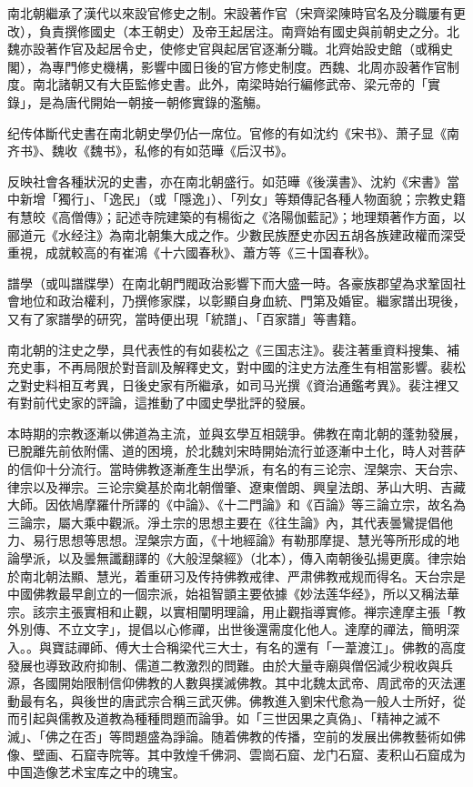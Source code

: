 南北朝繼承了漢代以來設官修史之制。宋設著作官（宋齊梁陳時官名及分職屢有更改），負責撰修國史（本王朝史）及帝王起居注。南齊始有國史與前朝史之分。北魏亦設著作官及起居令史，使修史官與起居官逐漸分職。北齊始設史館（或稱史閣），為專門修史機構，影響中國日後的官方修史制度。西魏、北周亦設著作官制度。南北諸朝又有大臣監修史書。此外，南梁時始行編修武帝、梁元帝的「實錄」，是為唐代開始一朝接一朝修實錄的濫觴。

纪传体斷代史書在南北朝史學仍佔一席位。官修的有如沈约《宋书》、萧子显《南齐书》、魏收《魏书》，私修的有如范曄《后汉书》。

反映社會各種狀況的史書，亦在南北朝盛行。如范曄《後漢書》、沈約《宋書》當中新增「獨行」、「逸民」（或「隱逸」）、「列女」等類傳記各種人物面貌；宗教史籍有慧皎《高僧傳》；記述寺院建築的有楊衒之《洛陽伽藍記》；地理類著作方面，以郦道元《水经注》為南北朝集大成之作。少數民族歷史亦因五胡各族建政權而深受重視，成就較高的有崔鴻《十六國春秋》、蕭方等《三十国春秋》。

譜學（或叫譜牒學）在南北朝門閥政治影響下而大盛一時。各豪族郡望為求鞏固社會地位和政治權利，乃撰修家牒，以彰顯自身血統、門第及婚宦。繼家譜出現後，又有了家譜學的研究，當時便出現「統譜」、「百家譜」等書籍。

南北朝的注史之學，具代表性的有如裴松之《三国志注》。裴注著重資料搜集、補充史事，不再局限於對音訓及解釋史文，對中國的注史方法產生有相當影響。裴松之對史料相互考異，日後史家有所繼承，如司马光撰《資治通鑑考異》。裴注裡又有對前代史家的評論，這推動了中國史學批評的發展。

本時期的宗教逐漸以佛道為主流，並與玄學互相競爭。佛教在南北朝的蓬勃發展，已脫離先前依附儒、道的困境，於北魏刘宋時開始流行並逐漸中土化，時人对菩萨的信仰十分流行。當時佛教逐漸產生出學派，有名的有三论宗、涅槃宗、天台宗、律宗以及禅宗。三论宗奠基於南北朝僧肇、遼東僧朗、興皇法朗、茅山大明、吉藏大師。因依鳩摩羅什所譯的《中論》、《十二門論》和《百論》等三論立宗，故名為三論宗，屬大乘中觀派。淨土宗的思想主要在《往生論》內，其代表曇鸞提倡他力、易行思想等思想。涅槃宗方面，《十地經論》有勒那摩提、慧光等所形成的地論學派，以及曇無讖翻譯的《大般涅槃經》（北本），傳入南朝後弘揚更廣。律宗始於南北朝法顯、慧光，着重研习及传持佛教戒律、严肃佛教戒规而得名。天台宗是中國佛教最早創立的一個宗派，始祖智顗主要依據《妙法莲华经》，所以又稱法華宗。該宗主張實相和止觀，以實相闡明理論，用止觀指導實修。禅宗達摩主張「教外別傳、不立文字」，提倡以心修禪，出世後還需度化他人。達摩的禪法，簡明深入。。與寶誌禪師、傅大士合稱梁代三大士，有名的還有「一葦渡江」。佛教的高度發展也導致政府抑制、儒道二教激烈的問難。由於大量寺廟與僧侶減少稅收與兵源，各國開始限制信仰佛教的人數與撲滅佛教。其中北魏太武帝、周武帝的灭法運動最有名，與後世的唐武宗合稱三武灭佛。佛教進入劉宋代愈為一般人士所好，從而引起與儒教及道教為種種問題而論爭。如「三世因果之真偽」、「精神之滅不滅」、「佛之在否」等問題盛為諍論。随着佛教的传播，空前的发展出佛教藝術如佛像、壁画、石窟寺院等。其中敦煌千佛洞、雲崗石窟、龙门石窟、麦积山石窟成为中国造像艺术宝库之中的瑰宝。


